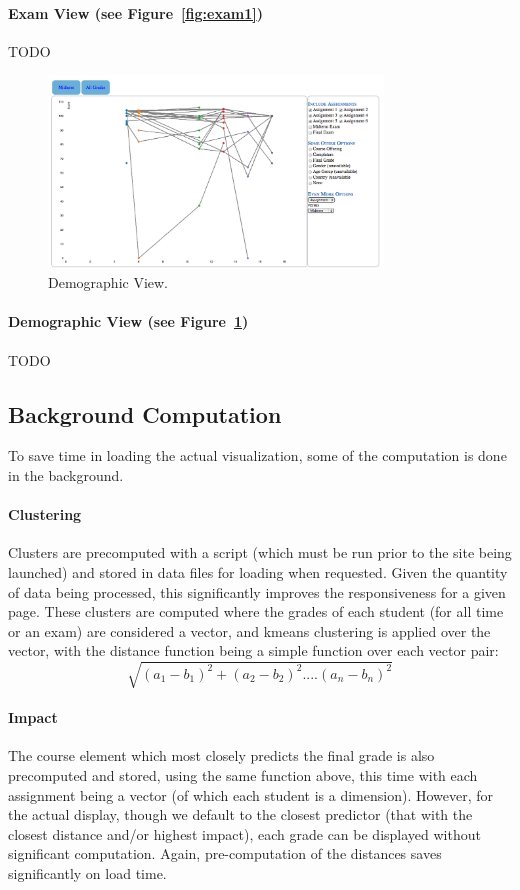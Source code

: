 \paragraph{Exam View (see Figure~\ref{fig:exam1})}
TODO


\begin{figure}[htb]
 \centering
 \includegraphics[width=3.5in]{aggregate_stub.png}
 \caption{Demographic View.}
  \label{fig:demo}	
\end{figure}

\paragraph{Demographic View (see Figure~\ref{fig:demo})}
TODO

\subsection{Background Computation}
To save time in loading the actual visualization, some of the computation is done in the background. 

\paragraph{Clustering}
Clusters are precomputed with a script (which must be run prior to the site being launched) and stored in data files for loading 
when requested. Given the quantity of data being processed, this significantly improves the responsiveness for a given page. 
These clusters are computed where the grades of each student (for all time or an exam) are considered a vector, and kmeans 
clustering is applied over the vector, with the distance function being a simple function over each vector pair:
\[  \sqrt{ (a_1-b_1)^2 + (a_2-b_2)^2 .... (a_n-b_n)^2   }\]

\paragraph{Impact}
The course element which most closely predicts the final grade is also precomputed and stored, using the same function above, this time with each assignment being a vector (of which each student is a dimension). However, for the actual display, though we default to the closest predictor (that with the closest distance and/or highest impact), each grade can be displayed without significant computation. Again, pre-computation of the distances saves significantly on load time. 
